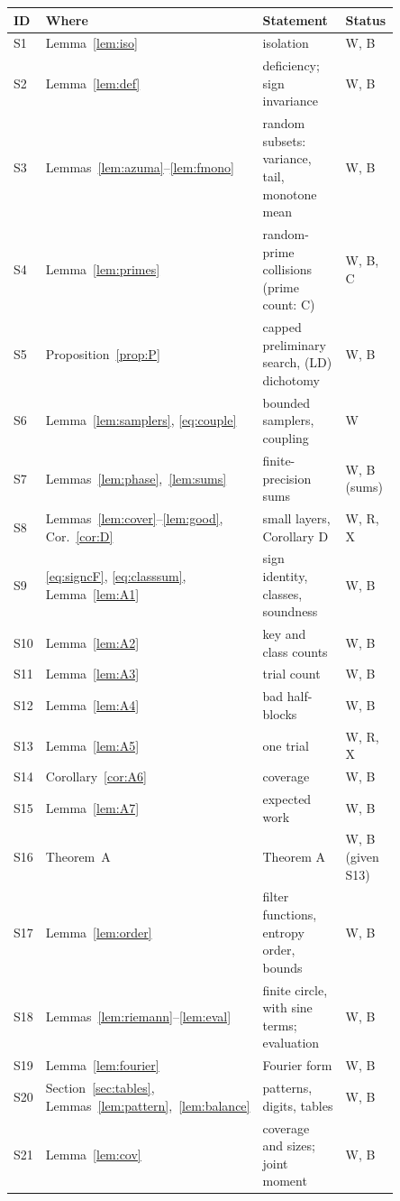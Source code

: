 \documentclass[11pt]{article}
\theoremstyle{definition}
\begin{document}
\begin{center}
\small
\begin{longtable}{lp{0.27\linewidth}p{0.40\linewidth}p{0.18\linewidth}}
\toprule
ID & Where & Statement & Status\\
\midrule
\endhead
S1 & Lemma~\ref{lem:iso} & isolation & W, B\\
S2 & Lemma~\ref{lem:def} & deficiency; sign invariance & W, B\\
S3 & Lemmas~\ref{lem:azuma}--\ref{lem:fmono} & random subsets: variance, tail, monotone mean & W, B\\
S4 & Lemma~\ref{lem:primes} & random-prime collisions (prime count: C) & W, B, C\\
S5 & Proposition~\ref{prop:P} & capped preliminary search, \textup{(LD)} dichotomy & W, B\\
S6 & Lemma~\ref{lem:samplers}, \eqref{eq:couple} & bounded samplers, coupling & W\\
S7 & Lemmas~\ref{lem:phase},~\ref{lem:sums} & finite-precision sums & W, B (sums)\\
S8 & Lemmas~\ref{lem:cover}--\ref{lem:good}, Cor.~\ref{cor:D} & small layers, Corollary D & W, R, X\\
S9 & \eqref{eq:signcF}, \eqref{eq:classsum}, Lemma~\ref{lem:A1} & sign identity, classes, soundness & W, B\\
S10 & Lemma~\ref{lem:A2} & key and class counts & W, B\\
S11 & Lemma~\ref{lem:A3} & trial count & W, B\\
S12 & Lemma~\ref{lem:A4} & bad half-blocks & W, B\\
S13 & Lemma~\ref{lem:A5} & one trial & W, R, X\\
S14 & Corollary~\ref{cor:A6} & coverage & W, B\\
S15 & Lemma~\ref{lem:A7} & expected work & W, B\\
S16 & Theorem~A & Theorem A & W, B (given S13)\\
S17 & Lemma~\ref{lem:order} & filter functions, entropy order, bounds & W, B\\
S18 & Lemmas~\ref{lem:riemann}--\ref{lem:eval} & finite circle, with sine terms; evaluation & W, B\\
S19 & Lemma~\ref{lem:fourier} & Fourier form & W, B\\
S20 & Section~\ref{sec:tables}, Lemmas~\ref{lem:pattern},~\ref{lem:balance} & patterns, digits, tables & W, B\\
S21 & Lemma~\ref{lem:cov} & coverage and sizes; joint moment & W, B\\

\end{longtable}
\end{center}
\end{document}

